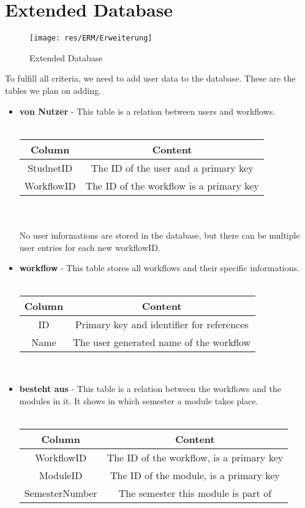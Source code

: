 \documentclass[11pt,a4paper]{report}
\begin{document}
{{{{{{{{{{{{{		\section{Extended Database}{
			\begin{figure}[ht]
				\centering
				\texttt{[image: res/ERM/Erweiterung]}
				\caption{Extended Database}
			\end{figure}
			To fulfill all criteria, we need to add user data to the database. These are the tables we plan on adding.
			\begin{itemize}
				\item \textbf{von Nutzer} - This table is a relation between users and workflows. \\ \\
					\begin{tabular}{|c|c|}
						\hline 
						\textbf{Column} & \textbf{Content} \\ 
						\hline 
						StudnetID & The ID of the user and a primary key \\ 
						WorkflowID & The ID of the workflow is a primary key \\ 
						\hline 
					\end{tabular} \\ \\
					No user informations are stored in the database, but there can be multiple user entries for each new workflowID. \\
				\item \textbf{workflow} - This table stores all workflows and their specific informations. \\ \\
					\begin{tabular}{|c|c|}
						\hline 
						\textbf{Column} & \textbf{Content} \\
						\hline 
						ID & Primary key and identifier for references \\ 
						Name & The user generated name of the workflow \\ 
						\hline 
					\end{tabular} \\
				\item \textbf{besteht aus} - This table is a relation between the workflows and the modules in it. It shows in which semester a module takes place. \\ \\
					\begin{tabular}{|c|c|}
						\hline 
						\textbf{Column} & \textbf{Content} \\
						\hline 
						WorkflowID & The ID of the workflow, is a primary key \\ 
						ModuleID & The ID of the module, is a primary key \\ 
						SemesterNumber & The semester this module is part of \\ 
						\hline 
					\end{tabular} 
			\end{itemize}
		}
		
}}}}}}}}}}}}}
\end{document}
